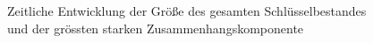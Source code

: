 \begin{figure}[th!]
  \centering
  \caption{Zeitliche Entwicklung der Größe des gesamten
    Schlüsselbestandes  und der
      grössten starken Zusammenhangskomponente }
  \label{fig:size-dev}
\end{figure}

